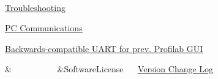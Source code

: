 \begin{center}
\begin{TabularC}{3}
\\
\hyperlink{troubleshoot}{Troubleshooting} \begin{DoxyItemize}
\item \hyperlink{ts-Comms}{P\+C Communications} \item \hyperlink{BCPGUI}{Backwards-\/compatible U\+A\+R\+T for prev. Profilab G\+U\+I} \end{DoxyItemize}
&~~~~~~~~~~ &Software\+License~\newline
~\newline
 \hyperlink{Changelog}{Version Change Log}  \\
\end{TabularC}
\end{center} 

~\newline
~\newline


